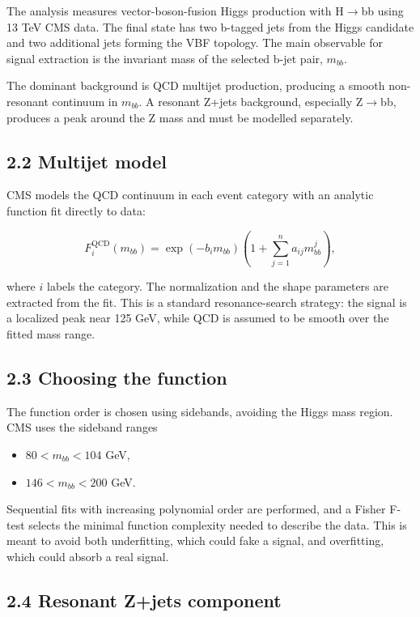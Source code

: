 \documentclass[11pt]{article}
\begin{document}
The analysis measures vector-boson-fusion Higgs production with H$\to$bb using 13 TeV CMS data. The final state has two b-tagged jets from the Higgs candidate and two additional jets forming the VBF topology. The main observable for signal extraction is the invariant mass of the selected b-jet pair, \(m_{bb}\).

The dominant background is QCD multijet production, producing a smooth non-resonant continuum in \(m_{bb}\). A resonant Z+jets background, especially Z$\to$bb, produces a peak around the Z mass and must be modelled separately.

\subsection{2.2 Multijet model}

CMS models the QCD continuum in each event category with an analytic function fit directly to data:

\[
F_i^{\mathrm{QCD}}(m_{bb}) = \exp(-b_i m_{bb})\left(1 + \sum_{j=1}^{n} a_{ij} m_{bb}^{j}\right),
\]

where \(i\) labels the category. The normalization and the shape parameters are extracted from the fit. This is a standard resonance-search strategy: the signal is a localized peak near 125 GeV, while QCD is assumed to be smooth over the fitted mass range.

\subsection{2.3 Choosing the function}

The function order is chosen using sidebands, avoiding the Higgs mass region. CMS uses the sideband ranges

\begin{itemize}
\item \(80 < m_{bb} < 104\) GeV,
\item \(146 < m_{bb} < 200\) GeV.
\end{itemize}

Sequential fits with increasing polynomial order are performed, and a Fisher F-test selects the minimal function complexity needed to describe the data. This is meant to avoid both underfitting, which could fake a signal, and overfitting, which could absorb a real signal.

\subsection{2.4 Resonant Z+jets component}
\end{document}

